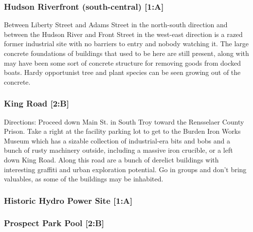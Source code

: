 \documentclass{article}
\begin{document}
\subsubsection{Hudson Riverfront (south-central) [1:A]}

Between Liberty Street and Adams Street in the north-south direction and between the Hudson River and Front Street in the west-east direction is a razed former industrial site with no barriers to entry and nobody watching it. The large concrete foundations of buildings that used to be here are still present, along with may have been some sort of concrete structure for removing goods from docked boats. Hardy opportunist tree and plant species can be seen growing out of the concrete.

\subsubsection{King Road [2:B]}
Directions: Proceed down Main St. in South Troy toward the Rensselaer County Prison. Take a right at the facility parking lot to get to the Burden Iron Works Museum which has a sizable collection of industrial-era bits and bobs and a bunch of rusty machinery outside, including a massive iron crucible, or a left down King Road. Along this road are a bunch of derelict buildings with interesting graffiti and urban exploration potential. Go in groups and don’t bring valuables, as some of the buildings may be inhabited.
\subsubsection{Historic Hydro Power Site [1:A]}
\subsubsection{Prospect Park Pool [2:B]}
\end{document}
